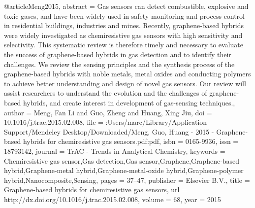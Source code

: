 @article{Meng2015,
abstract = {Gas sensors can detect combustible, explosive and toxic gases, and have been widely used in safety monitoring and process control in residential buildings, industries and mines. Recently, graphene-based hybrids were widely investigated as chemiresistive gas sensors with high sensitivity and selectivity. This systematic review is therefore timely and necessary to evaluate the success of graphene-based hybrids in gas detection and to identify their challenges. We review the sensing principles and the synthesis process of the graphene-based hybrids with noble metals, metal oxides and conducting polymers to achieve better understanding and design of novel gas sensors. Our review will assist researchers to understand the evolution and the challenges of graphene-based hybrids, and create interest in development of gas-sensing techniques.},
author = {Meng, Fan Li and Guo, Zheng and Huang, Xing Jiu},
doi = {10.1016/j.trac.2015.02.008},
file = {:Users/marc/Library/Application Support/Mendeley Desktop/Downloaded/Meng, Guo, Huang - 2015 - Graphene-based hybrids for chemiresistive gas sensors.pdf:pdf},
isbn = {0165-9936},
issn = {18793142},
journal = {TrAC - Trends in Analytical Chemistry},
keywords = {Chemiresistive gas sensor,Gas detection,Gas sensor,Graphene,Graphene-based hybrid,Graphene-metal hybrid,Graphene-metal-oxide hybrid,Graphene-polymer hybrid,Nanocomposite,Sensing},
pages = {37--47},
publisher = {Elsevier B.V.},
title = {{Graphene-based hybrids for chemiresistive gas sensors}},
url = {http://dx.doi.org/10.1016/j.trac.2015.02.008},
volume = {68},
year = {2015}
}
